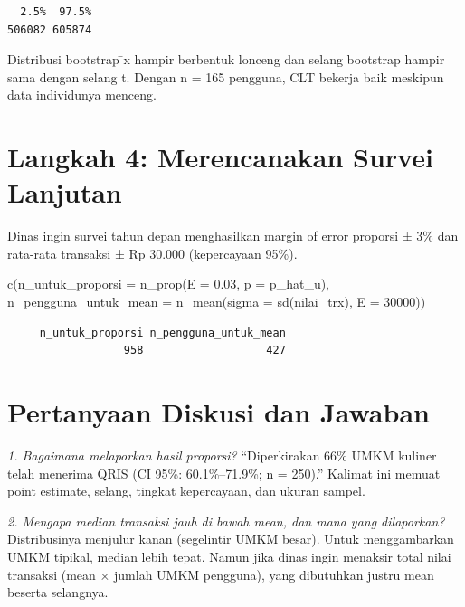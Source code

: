 \documentclass[
  indonesian,
  letterpaper,
]{book}
\newenvironment{Shaded}{\begin{snugshade}}{\end{snugshade}}
\newcommand{\AttributeTok}[1]{\textcolor[rgb]{0.40,0.45,0.13}{#1}}
\newcommand{\DecValTok}[1]{\textcolor[rgb]{0.68,0.00,0.00}{#1}}
\newcommand{\FloatTok}[1]{\textcolor[rgb]{0.68,0.00,0.00}{#1}}
\newcommand{\FunctionTok}[1]{\textcolor[rgb]{0.28,0.35,0.67}{#1}}
\newcommand{\NormalTok}[1]{\textcolor[rgb]{0.00,0.23,0.31}{#1}}
\begin{document}
\begin{verbatim}
  2.5%  97.5% 
506082 605874 
\end{verbatim}

Distribusi bootstrap ̄x hampir berbentuk lonceng dan selang bootstrap
hampir sama dengan selang t. Dengan n = 165 pengguna, CLT bekerja baik
meskipun data individunya menceng.

\section{Langkah 4: Merencanakan Survei
Lanjutan}\label{langkah-4-merencanakan-survei-lanjutan}

Dinas ingin survei tahun depan menghasilkan margin of error proporsi ±
3\% dan rata-rata transaksi ± Rp 30.000 (kepercayaan 95\%).

\begin{Shaded}
\begin{Highlighting}[]
\FunctionTok{c}\NormalTok{(}\AttributeTok{n\_untuk\_proporsi =} \FunctionTok{n\_prop}\NormalTok{(}\AttributeTok{E =} \FloatTok{0.03}\NormalTok{, }\AttributeTok{p =}\NormalTok{ p\_hat\_u),}
\AttributeTok{n\_pengguna\_untuk\_mean =} \FunctionTok{n\_mean}\NormalTok{(}\AttributeTok{sigma =} \FunctionTok{sd}\NormalTok{(nilai\_trx), }\AttributeTok{E =} \DecValTok{30000}\NormalTok{))}
\end{Highlighting}
\end{Shaded}

\begin{verbatim}
     n_untuk_proporsi n_pengguna_untuk_mean 
                  958                   427 
\end{verbatim}

\section{Pertanyaan Diskusi dan
Jawaban}\label{pertanyaan-diskusi-dan-jawaban}

\emph{1. Bagaimana melaporkan hasil proporsi?} ``Diperkirakan 66\% UMKM
kuliner telah menerima QRIS (CI 95\%: 60.1\%--71.9\%; n = 250).''
Kalimat ini memuat point estimate, selang, tingkat kepercayaan, dan
ukuran sampel.

\emph{2. Mengapa median transaksi jauh di bawah mean, dan mana yang
dilaporkan?} Distribusinya menjulur kanan (segelintir UMKM besar). Untuk
menggambarkan UMKM tipikal, median lebih tepat. Namun jika dinas ingin
menaksir total nilai transaksi (mean × jumlah UMKM pengguna), yang
dibutuhkan justru mean beserta selangnya.
\end{document}
